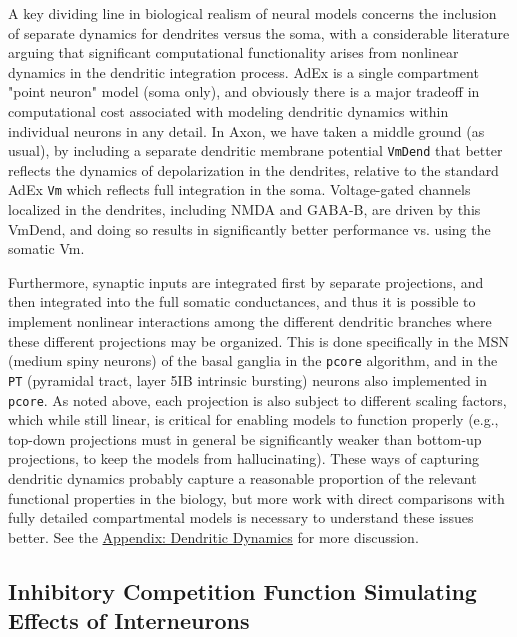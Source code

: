 \documentclass[11pt,twoside]{article}
\newif\myifpdf
\begin{document}
A key dividing line in biological realism of neural models concerns the inclusion of separate dynamics for dendrites versus the soma, with a considerable literature arguing that significant computational functionality arises from nonlinear dynamics in the dendritic integration process. AdEx is a single compartment "point neuron" model (soma only), and obviously there is a major tradeoff in computational cost associated with modeling dendritic dynamics within individual neurons in any detail. In Axon, we have taken a middle ground (as usual), by including a separate dendritic membrane potential \texttt{VmDend} that better reflects the dynamics of depolarization in the dendrites, relative to the standard AdEx \texttt{Vm} which reflects full integration in the soma. Voltage-gated channels localized in the dendrites, including NMDA and GABA-B, are driven by this VmDend, and doing so results in significantly better performance vs. using the somatic Vm.

Furthermore, synaptic inputs are integrated first by separate projections, and then integrated into the full somatic conductances, and thus it is possible to implement nonlinear interactions among the different dendritic branches where these different projections may be organized. This is done specifically in the MSN (medium spiny neurons) of the basal ganglia in the \texttt{pcore} algorithm, and in the \texttt{PT} (pyramidal tract, layer 5IB intrinsic bursting) neurons also implemented in \texttt{pcore}. As noted above, each projection is also subject to different scaling factors, which while still linear, is critical for enabling models to function properly (e.g., top-down projections must in general be significantly weaker than bottom-up projections, to keep the models from hallucinating). These ways of capturing dendritic dynamics probably capture a reasonable proportion of the relevant functional properties in the biology, but more work with direct comparisons with fully detailed compartmental models is necessary to understand these issues better. See the \protect\hyperlink{appendix-dendritic-dynamics}{Appendix: Dendritic Dynamics} for more discussion. 


\subsection{Inhibitory Competition Function Simulating Effects of Interneurons}
\end{document}
